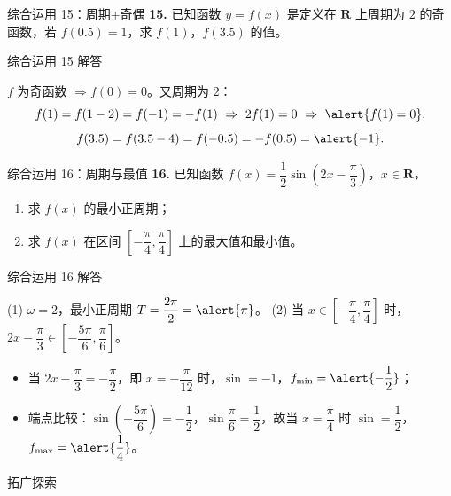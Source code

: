 \documentclass[10pt,aspectratio=169,serif]{beamer}
\begin{document}
\begin{frame}[t]{综合运用 15：周期+奇偶}
\textbf{15.} 已知函数 $y=f(x)$ 是定义在 $\mathbf R$ 上周期为 $2$ 的奇函数，若 $f(0.5)=1$，求 $f(1)$，$f(3.5)$ 的值。
\end{frame}

\begin{frame}[t]{综合运用 15 解答}
\begin{tcolorbox}[colback=orange!10,colframe=orange,title=\textbf{解}]
$f$ 为奇函数 $\Rightarrow f(0)=0$。又周期为 $2$：
\[
f(1)=f(1-2)=f(-1)=-f(1)\ \Rightarrow\ 2f(1)=0\ \Rightarrow\ \alert{f(1)=0}.
\]
\[
f(3.5)=f(3.5-4)=f(-0.5)=-f(0.5)=\alert{-1}.
\]
\end{tcolorbox}
\end{frame}

\begin{frame}[t]{综合运用 16：周期与最值}
\textbf{16.} 已知函数 $f(x)=\dfrac12\sin\!\left(2x-\dfrac{\pi}{3}\right)$，$x\in\mathbf R$，
\begin{enumerate}[(1)]
  \item 求 $f(x)$ 的最小正周期；
  \item 求 $f(x)$ 在区间 $\left[-\dfrac{\pi}{4},\dfrac{\pi}{4}\right]$ 上的最大值和最小值。
\end{enumerate}
\end{frame}

\begin{frame}[t]{综合运用 16 解答}
\begin{tcolorbox}[colback=orange!10,colframe=orange,title=\textbf{解}]
(1) $\omega=2$，最小正周期 $T=\dfrac{2\pi}{2}=\alert{\pi}$。
\vspace{0.3em}
(2) 当 $x\in\left[-\dfrac\pi4,\dfrac\pi4\right]$ 时，$2x-\dfrac\pi3\in\left[-\dfrac{5\pi}{6},\dfrac\pi6\right]$。
\begin{itemize}
  \item 当 $2x-\dfrac\pi3=-\dfrac\pi2$，即 $x=-\dfrac\pi{12}$ 时，$\sin=-1$，$f_{\min}=\alert{-\dfrac12}$；
  \item 端点比较：$\sin\!\left(-\dfrac{5\pi}{6}\right)=-\dfrac12$，$\sin\dfrac\pi6=\dfrac12$，故当 $x=\dfrac\pi4$ 时 $\sin=\dfrac12$，$f_{\max}=\alert{\dfrac14}$。
\end{itemize}
\end{tcolorbox}
\end{frame}

\begin{frame}[c]\Huge\centering 拓广探索\end{frame}
\end{document}

